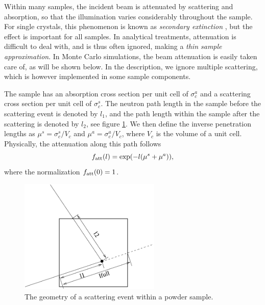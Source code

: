 Within many samples,
the incident beam is attenuated by scattering and absorption,
so that the illumination varies considerably throughout the sample.
For single crystals, this phenomenon is known as
{\em secondary extinction} \cite{bacon}, but the effect is
important for all samples.
In analytical treatments, attenuation is difficult to deal with,
and is thus often ignored, making a {\em thin sample approximation}.
In Monte Carlo simulations, the beam attenuation
is easily taken care of, as will be shown below.
In the description, we ignore multiple scattering, which is however
 implemented in some sample components.

The sample has an absorption cross section per unit cell of
$\sigma_c^a$ and a scattering cross section per unit cell
of $\sigma_c^s$. The neutron path length
in the sample before the scattering event is denoted by $l_1$, and
the path length within the sample after the scattering
is denoted by $l_2$, see figure \ref{powderFig}.
We then define the inverse penetration lengths as
$\mu^s = \sigma_c^s / V_c$ and $\mu^a = \sigma_c^a / V_c$, where
$V_c$ is the volume of a unit cell. Physically, the attenuation
along this path follows
\begin{equation}
f_{\rm att}(l) = \exp(- l (\mu^s + \mu^a)) ,
\end{equation}
where the normalization $f_{\rm att}(0)=1$.

\begin{figure}
  \begin{center}
    \includegraphics[width=0.6\textwidth]{figures/scatter}
  \end{center}
\caption{The geometry of a scattering event within a powder sample.}
\label{powderFig}
\end{figure}


